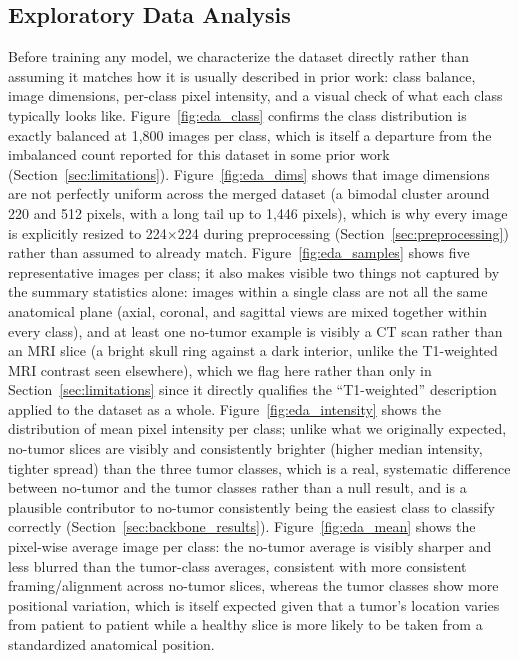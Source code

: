 \documentclass[11pt]{article}
\begin{document}
\subsection{Exploratory Data Analysis}
\label{sec:eda}

Before training any model, we characterize the dataset directly rather than assuming it matches how it is usually described in prior work: class balance, image dimensions, per-class pixel intensity, and a visual check of what each class typically looks like. Figure~\ref{fig:eda_class} confirms the class distribution is exactly balanced at 1,800 images per class, which is itself a departure from the imbalanced count reported for this dataset in some prior work (Section~\ref{sec:limitations}). Figure~\ref{fig:eda_dims} shows that image dimensions are not perfectly uniform across the merged dataset (a bimodal cluster around 220 and 512 pixels, with a long tail up to 1,446 pixels), which is why every image is explicitly resized to 224$\times$224 during preprocessing (Section~\ref{sec:preprocessing}) rather than assumed to already match. Figure~\ref{fig:eda_samples} shows five representative images per class; it also makes visible two things not captured by the summary statistics alone: images within a single class are not all the same anatomical plane (axial, coronal, and sagittal views are mixed together within every class), and at least one no-tumor example is visibly a CT scan rather than an MRI slice (a bright skull ring against a dark interior, unlike the T1-weighted MRI contrast seen elsewhere), which we flag here rather than only in Section~\ref{sec:limitations} since it directly qualifies the ``T1-weighted'' description applied to the dataset as a whole. Figure~\ref{fig:eda_intensity} shows the distribution of mean pixel intensity per class; unlike what we originally expected, no-tumor slices are visibly and consistently brighter (higher median intensity, tighter spread) than the three tumor classes, which is a real, systematic difference between no-tumor and the tumor classes rather than a null result, and is a plausible contributor to no-tumor consistently being the easiest class to classify correctly (Section~\ref{sec:backbone_results}). Figure~\ref{fig:eda_mean} shows the pixel-wise average image per class: the no-tumor average is visibly sharper and less blurred than the tumor-class averages, consistent with more consistent framing/alignment across no-tumor slices, whereas the tumor classes show more positional variation, which is itself expected given that a tumor's location varies from patient to patient while a healthy slice is more likely to be taken from a standardized anatomical position.
\end{document}
